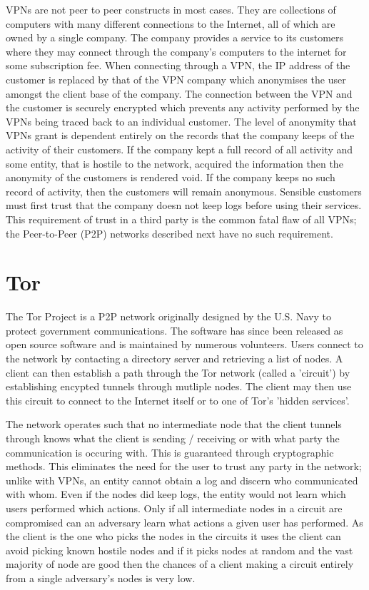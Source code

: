 \documentclass[ %
                    author={Luke Murray},
                supervisor={Dr. Simon Hollis},
                     title={Shadow Peer-to-Peer Networks},
                  subtitle={},
                    degree={MEng},
                      year={2013} ]{thesis}
\begin{document}
VPNs are not peer to peer constructs in most cases. They are collections of computers with many different connections to the Internet, all of which are owned by a single company. The company provides a service to its customers where they may connect through the company's computers to the internet for some subscription fee. When connecting through a VPN, the IP address of the customer is replaced by that of the VPN company which anonymises the user amongst the client base of the company. The connection between the VPN and the customer is securely encrypted which prevents any activity performed by the VPNs being traced back to an individual customer. The level of anonymity that VPNs grant is dependent entirely on the records that the company keeps of the activity of their customers. If the company kept a full record of all activity and some entity, that is hostile to the network, acquired the information then the anonymity of the customers is rendered void. If the company keeps no such record of activity, then the customers will remain anonymous. Sensible customers must first trust that the company doesn not keep logs before using their services. This requirement of trust in a third party is the common fatal flaw of all VPNs; the Peer-to-Peer (P2P) networks described next have no such requirement.

\section{Tor}

The Tor Project\cite{Tor} is a P2P network originally designed by the U.S. Navy to protect government communications. The software has since been released as open source software and is maintained by numerous volunteers. Users connect to the network by contacting a directory server and retrieving a list of nodes. A client can then establish a path through the Tor network (called a 'circuit') by establishing encypted tunnels through mutliple nodes. The client may then use this circuit to connect to the Internet itself or to one of Tor's 'hidden services'.

The network operates such that no intermediate node that the client tunnels through knows what the client is sending / receiving or with what party the communication is occuring with. This is guaranteed through cryptographic methods. This eliminates the need for the user to trust any party in the network; unlike with VPNs, an entity cannot obtain a log and discern who communicated with whom. Even if the nodes did keep logs, the entity would not learn which users performed which actions. Only if all intermediate nodes in a circuit are compromised can an adversary learn what actions a given user has performed. As the client is the one who picks the nodes in the circuits it uses the client can avoid picking known hostile nodes and if it picks nodes at random and the vast majority of node are good then the chances of a client making a circuit entirely from a single adversary's nodes is very low.
\end{document}
